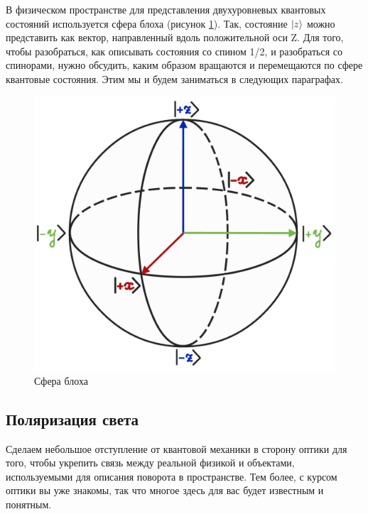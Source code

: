 В физическом пространстве для представления двухуровневых квантовых состояний используется сфера блоха (рисунок \ref{fig B.3}). Так, состояние $\ket{z}$ можно представить как вектор, направленный вдоль положительной оси Z. Для того, чтобы разобраться, как описывать состояния со спином 1/2, и разобраться со спинорами, нужно обсудить, каким образом вращаются и перемещаются по сфере квантовые состояния. Этим мы и будем заниматься в следующих параграфах.
\begin{figure}[!ht]
\centering
\includegraphics[scale=0.23]{appendix/images/bloch sphere.png}
\caption{Сфера блоха}
\label{fig B.3}
\end{figure}

\subsection{Поляризация света}
Сделаем небольшое отступление от квантовой механики в сторону оптики для того, чтобы укрепить связь между реальной физикой и объектами, используемыми для описания поворота в пространстве. Тем более, с курсом оптики вы уже знакомы, так что многое здесь для вас будет известным и понятным.
